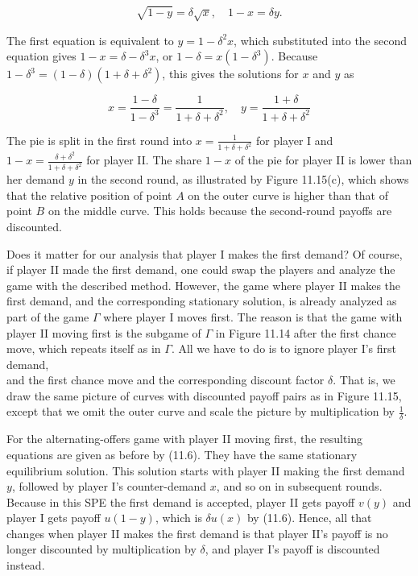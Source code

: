 \documentclass[12pt]{article}
\begin{document}
$$
\sqrt{1-y}=\delta \sqrt{x}, \quad 1-x=\delta y .
$$

The first equation is equivalent to $y=1-\delta^{2} x$, which substituted into the second equation gives $1-x=\delta-\delta^{3} x$, or $1-\delta=x\left(1-\delta^{3}\right)$. Because $1-\delta^{3}=(1-\delta)\left(1+\delta+\delta^{2}\right)$, this gives the solutions for $x$ and $y$ as


\begin{equation*}
x=\frac{1-\delta}{1-\delta^{3}}=\frac{1}{1+\delta+\delta^{2}}, \quad y=\frac{1+\delta}{1+\delta+\delta^{2}} \tag{11.7}
\end{equation*}


The pie is split in the first round into $x=\frac{1}{1+\delta+\delta^{2}}$ for player I and $1-x=\frac{\delta+\delta^{2}}{1+\delta+\delta^{2}}$ for player II. The share $1-x$ of the pie for player II is lower than her demand $y$ in the second round, as illustrated by Figure 11.15(c), which shows that the relative position of point $A$ on the outer curve is higher than that of point $B$ on the middle curve. This holds because the second-round payoffs are discounted.

Does it matter for our analysis that player I makes the first demand? Of course, if player II made the first demand, one could swap the players and analyze the game with the described method. However, the game where player II makes the first demand, and the corresponding stationary solution, is already analyzed as part of the game $\Gamma$ where player I moves first. The reason is that the game with player II moving first is the subgame of $\Gamma$ in Figure 11.14 after the first chance move, which repeats itself as in $\Gamma$. All we have to do is to ignore player I's first demand,\\
and the first chance move and the corresponding discount factor $\delta$. That is, we draw the same picture of curves with discounted payoff pairs as in Figure 11.15, except that we omit the outer curve and scale the picture by multiplication by $\frac{1}{\delta}$.

For the alternating-offers game with player II moving first, the resulting equations are given as before by (11.6). They have the same stationary equilibrium solution. This solution starts with player II making the first demand $y$, followed by player I's counter-demand $x$, and so on in subsequent rounds. Because in this SPE the first demand is accepted, player II gets payoff $v(y)$ and player I gets payoff $u(1-y)$, which is $\delta u(x)$ by (11.6). Hence, all that changes when player II makes the first demand is that player II's payoff is no longer discounted by multiplication by $\delta$, and player I's payoff is discounted instead.
\end{document}
